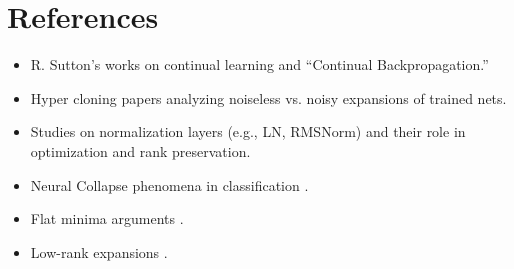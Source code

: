 \documentclass[11pt]{article}
\begin{document}

\section*{References}
\begin{itemize}
    \item R. Sutton's works on continual learning and ``Continual Backpropagation.''
    \item Hyper cloning papers analyzing noiseless vs. noisy expansions of trained nets.
    \item Studies on normalization layers (e.g., LN, RMSNorm) and their role in optimization and rank preservation.
    \item Neural Collapse phenomena in classification \cite{Papyan2020neural}.
    \item Flat minima arguments \cite{Hochreiter1997flat, Keskar2017large}.
    \item Low-rank expansions \cite{Arora2019finegrain,Chaudhari2019entropy}.
\end{itemize}
\end{document}
